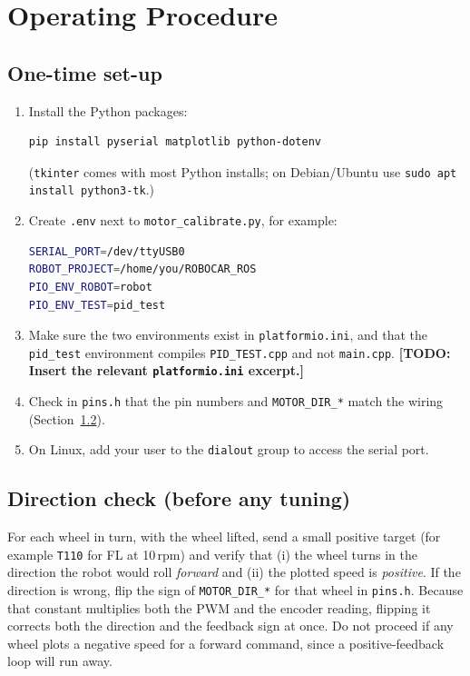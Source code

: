 \documentclass[11pt,a4paper]{report}
\newcommand{\code}[1]{\texttt{#1}}
\newcommand{\todo}[1]{\textcolor{warnred}{\textbf{[TODO: #1]}}}
\begin{document}
\chapter{Operating Procedure}

\section{One-time set-up}
\begin{enumerate}
  \item Install the Python packages:
\begin{lstlisting}[language=bash]
pip install pyserial matplotlib python-dotenv
\end{lstlisting}
  (\code{tkinter} comes with most Python installs; on Debian/Ubuntu use \code{sudo apt install python3-tk}.)
  \item Create \code{.env} next to \code{motor\_calibrate.py}, for example:
\begin{lstlisting}[language=bash]
SERIAL_PORT=/dev/ttyUSB0
ROBOT_PROJECT=/home/you/ROBOCAR_ROS
PIO_ENV_ROBOT=robot
PIO_ENV_TEST=pid_test
\end{lstlisting}
  \item Make sure the two environments exist in \code{platformio.ini}, and that the \code{pid\_test} environment compiles \code{PID\_TEST.cpp} and not \code{main.cpp}. \todo{Insert the relevant \code{platformio.ini} excerpt.}
  \item Check in \code{pins.h} that the pin numbers and \code{MOTOR\_DIR\_*} match the wiring (Section~\ref{sec:dir}).
  \item On Linux, add your user to the \code{dialout} group to access the serial port.
\end{enumerate}

\section{Direction check (before any tuning)}\label{sec:dir}
For each wheel in turn, with the wheel lifted, send a small positive target (for example \code{T110} for FL at 10\,rpm) and verify that (i) the wheel turns in the direction the robot would roll \emph{forward} and (ii) the plotted speed is \emph{positive}. If the direction is wrong, flip the sign of \code{MOTOR\_DIR\_*} for that wheel in \code{pins.h}. Because that constant multiplies both the PWM and the encoder reading, flipping it corrects both the direction and the feedback sign at once. Do not proceed if any wheel plots a negative speed for a forward command, since a positive-feedback loop will run away.
\end{document}
